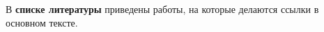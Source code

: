 
В \textbf{списке литературы} приведены работы, на которые делаются ссылки в основном тексте.


\newpage




